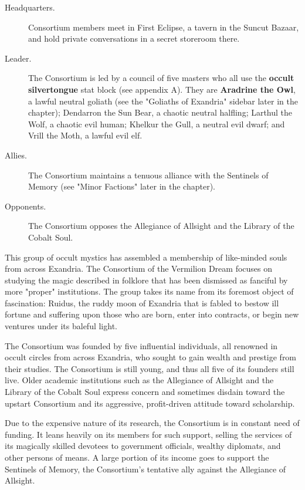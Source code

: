 \documentclass[10pt,a4paper,twoside,fancy,bg=print,twocolumn,openany,nodeprecatedcode]{dndbook}
\begin{document}
\begin{description}
\item[Headquarters.]
Consortium members meet in First Eclipse, a tavern in the Suncut Bazaar, and hold private conversations in a secret storeroom there.
\item[Leader.]
The Consortium is led by a council of five masters who all use the \textbf{occult silvertongue} stat block (see appendix A). They are \textbf{Aradrine the Owl}, a lawful neutral goliath (see the "Goliaths of Exandria" sidebar later in the chapter); Dendarron the Sun Bear, a chaotic neutral halfling; Larthul the Wolf, a chaotic evil human; Khelkur the Gull, a neutral evil dwarf; and Vrill the Moth, a lawful evil elf.
\item[Allies.]
The Consortium maintains a tenuous alliance with the Sentinels of Memory (see "Minor Factions" later in the chapter).
\item[Opponents.]
The Consortium opposes the Allegiance of Allsight and the Library of the Cobalt Soul.
\end{description}

This group of occult mystics has assembled a membership of like-minded souls from across Exandria. The Consortium of the Vermilion Dream focuses on studying the magic described in folklore that has been dismissed as fanciful by more "proper" institutions. The group takes its name from its foremost object of fascination: Ruidus, the ruddy moon of Exandria that is fabled to bestow ill fortune and suffering upon those who are born, enter into contracts, or begin new ventures under its baleful light.

The Consortium was founded by five influential individuals, all renowned in occult circles from across Exandria, who sought to gain wealth and prestige from their studies. The Consortium is still young, and thus all five of its founders still live. Older academic institutions such as the Allegiance of Allsight and the Library of the Cobalt Soul express concern and sometimes disdain toward the upstart Consortium and its aggressive, profit-driven attitude toward scholarship.

Due to the expensive nature of its research, the Consortium is in constant need of funding. It leans heavily on its members for such support, selling the services of its magically skilled devotees to government officials, wealthy diplomats, and other persons of means. A large portion of its income goes to support the Sentinels of Memory, the Consortium's tentative ally against the Allegiance of Allsight.
\end{document}
